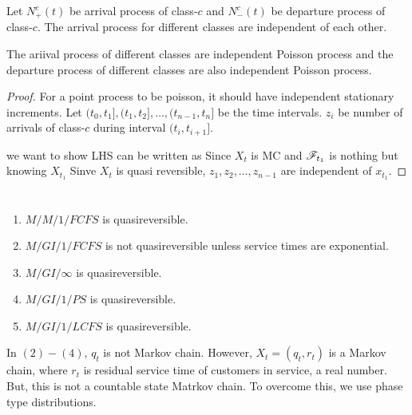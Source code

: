\documentclass[all-lectures.tex]{subfiles}
\begin{document}
Let $N_+^c (t)$ be arrival process of class-$c$ and $N_-^c (t)$ be departure process of class-$c$.
The arrival process for different classes are independent of each other.
\begin{prop}
The ariival process of different classes are independent Poisson process and the departure  process of different classes are also independent Poisson process.
\end{prop}
\begin{proof}
For a point process to be poisson, it should have independent stationary increments.
Let $(t_0,t_1], (t_1,t_2], \dots, (t_{n-1},t_n]$ be the time intervals.
$z_i$ be number of arrivals of class-$c$ during interval $(t_i,t_{i+1}]$.

we want to show
LHS can be written as 
Since $X_{t}$ is MC and $\mathscr{F}_{t_1}$ is nothing but knowing $X_{t_1}$
\eq{
&= \E[f_0(z_0) \E[f_1(z_1), \dots, f_{n-1}(z_{n-1})|X_{t_1}]]
}
Sinve $X_t$ is quasi reversible, $z_1, z_2, \dots, z_{n-1}$ are independent of $x_{t_1}$.
\end{proof}

\section{{\color{red}{Single server queue}}}

\begin{enumerate}[label=(\arabic*)]
\item $M/M/1/FCFS$ is quasireversible.
\item $M/GI/1/FCFS$ is not quasireversible unless service times are exponential.
\item $M/GI/\infty$ is quasireversible.
\item $M/GI/1/PS$ is quasireversible.
\item $M/GI/1/LCFS$ is quasireversible.
\end{enumerate}

In $(2)-(4)$, $q_t$ is not Markov chain. However, $X_t = (q_t,r_t)$ is a Markov chain, where $r_t$ is residual service time of customers in service, a real number. But, this is not a countable state Matrkov chain. To overcome this, we use phase type distributions. 
\end{document}
